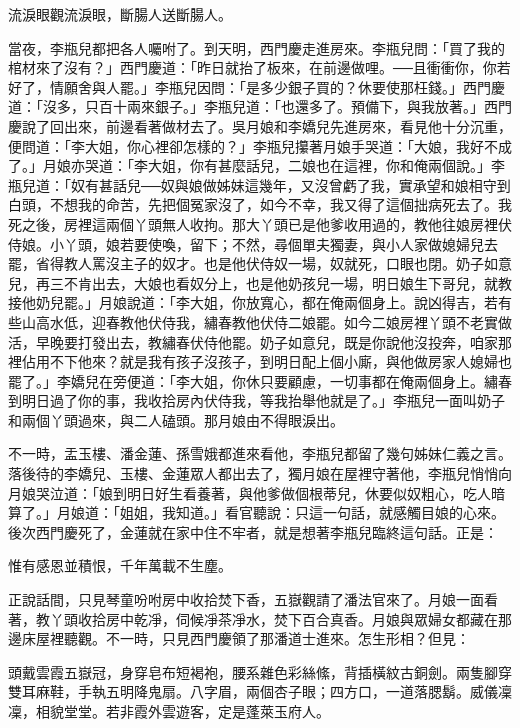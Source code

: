 流淚眼觀流淚眼，斷腸人送斷腸人。

當夜，李瓶兒都把各人囑咐了。到天明，西門慶走進房來。李瓶兒問：「買了我的棺材來了沒有？」西門慶道：「昨日就抬了板來，在前邊做哩。──且衝衝你，你若好了，情願舍與人罷。」李瓶兒因問：「是多少銀子買的？休要使那枉錢。」西門慶道：「沒多，只百十兩來銀子。」李瓶兒道：「也還多了。預備下，與我放著。」西門慶說了回出來，前邊看著做材去了。吳月娘和李嬌兒先進房來，看見他十分沉重，便問道：「李大姐，你心裡卻怎樣的？」李瓶兒攥著月娘手哭道：「大娘，我好不成了。」月娘亦哭道：「李大姐，你有甚麼話兒，二娘也在這裡，你和俺兩個說。」李瓶兒道：「奴有甚話兒──奴與娘做姊妹這幾年，又沒曾虧了我，實承望和娘相守到白頭，不想我的命苦，先把個冤家沒了，如今不幸，我又得了這個拙病死去了。我死之後，房裡這兩個丫頭無人收拘。那大丫頭已是他爹收用過的，教他往娘房裡伏侍娘。小丫頭，娘若要使喚，留下；不然，尋個單夫獨妻，與小人家做媳婦兒去罷，省得教人罵沒主子的奴才。也是他伏侍奴一場，奴就死，口眼也閉。奶子如意兒，再三不肯出去，大娘也看奴分上，也是他奶孩兒一場，明日娘生下哥兒，就教接他奶兒罷。」月娘說道：「李大姐，你放寬心，都在俺兩個身上。說凶得吉，若有些山高水低，迎春教他伏侍我，繡春教他伏侍二娘罷。如今二娘房裡丫頭不老實做活，早晚要打發出去，教繡春伏侍他罷。奶子如意兒，既是你說他沒投奔，咱家那裡佔用不下他來？就是我有孩子沒孩子，到明日配上個小廝，與他做房家人媳婦也罷了。」李嬌兒在旁便道：「李大姐，你休只要顧慮，一切事都在俺兩個身上。繡春到明日過了你的事，我收拾房內伏侍我，等我抬舉他就是了。」李瓶兒一面叫奶子和兩個丫頭過來，與二人磕頭。那月娘由不得眼淚出。

不一時，盂玉樓、潘金蓮、孫雪娥都進來看他，李瓶兒都留了幾句姊妹仁義之言。落後待的李嬌兒、玉樓、金蓮眾人都出去了，獨月娘在屋裡守著他，李瓶兒悄悄向月娘哭泣道：「娘到明日好生看養著，與他爹做個根蒂兒，休要似奴粗心，吃人暗算了。」月娘道：「姐姐，我知道。」看官聽說：只這一句話，就感觸目娘的心來。後次西門慶死了，金蓮就在家中住不牢者，就是想著李瓶兒臨終這句話。正是：

惟有感恩並積恨，千年萬載不生塵。

正說話間，只見琴童吩咐房中收拾焚下香，五嶽觀請了潘法官來了。月娘一面看著，教丫頭收拾房中乾凈，伺候凈茶凈水，焚下百合真香。月娘與眾婦女都藏在那邊床屋裡聽觀。不一時，只見西門慶領了那潘道士進來。怎生形相？但見：

頭戴雲霞五嶽冠，身穿皂布短褐袍，腰系雜色彩絲絛，背插橫紋古銅劍。兩隻腳穿雙耳麻鞋，手執五明降鬼扇。八字眉，兩個杏子眼；四方口，一道落腮鬍。威儀凜凜，相貌堂堂。若非霞外雲遊客，定是蓬萊玉府人。

